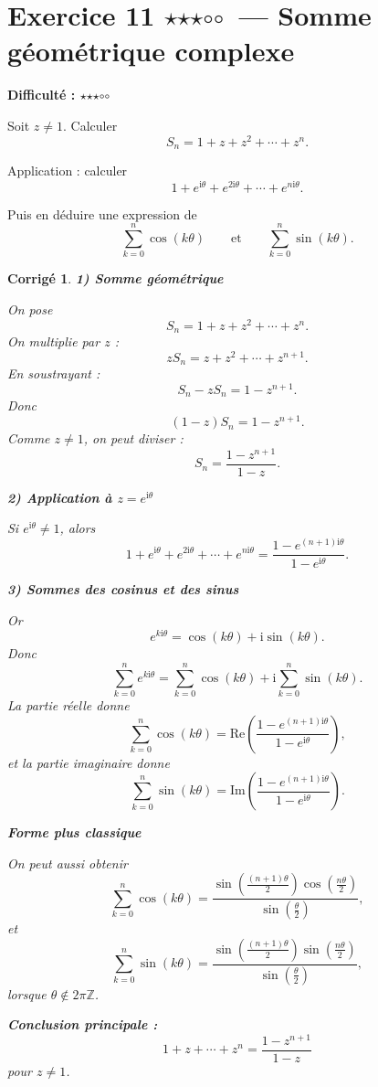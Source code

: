 \documentclass[11pt,a4paper]{article}
\newtheorem*{corrige}{Corrigé}
\newcommand{\ii}{\mathrm{i}}
\newcommand{\Ree}{\mathrm{Re}}
\newcommand{\Imm}{\mathrm{Im}}
\newcommand{\fullstar}{\(\star\)}
\newcommand{\emptystar}{\(\circ\)}
\newcommand{\threeStars}{\fullstar\fullstar\fullstar\emptystar\emptystar}
\newcommand{\difficulty}[1]{\textbf{Difficulté : #1}}
\begin{document}
\section{Exercice 11 \threeStars\ --- Somme géométrique complexe}
\difficulty{\threeStars}

Soit \(z\neq 1\). Calculer
\[
S_n=1+z+z^2+\cdots+z^n.
\]

Application : calculer
\[
1+e^{\ii\theta}+e^{2\ii\theta}+\cdots+e^{n\ii\theta}.
\]

Puis en déduire une expression de
\[
\sum_{k=0}^n \cos(k\theta)
\qquad \text{et} \qquad
\sum_{k=0}^n \sin(k\theta).
\]

\begin{corrige}
\textbf{1) Somme géométrique}

On pose
\[
S_n=1+z+z^2+\cdots+z^n.
\]
On multiplie par \(z\) :
\[
zS_n=z+z^2+\cdots+z^{n+1}.
\]
En soustrayant :
\[
S_n-zS_n=1-z^{n+1}.
\]
Donc
\[
(1-z)S_n=1-z^{n+1}.
\]
Comme \(z\neq 1\), on peut diviser :
\[
\boxed{S_n=\frac{1-z^{n+1}}{1-z}}.
\]

\textbf{2) Application à \(z=e^{\ii\theta}\)}

Si \(e^{\ii\theta}\neq 1\), alors
\[
1+e^{\ii\theta}+e^{2\ii\theta}+\cdots+e^{n\ii\theta}
=\frac{1-e^{(n+1)\ii\theta}}{1-e^{\ii\theta}}.
\]

\textbf{3) Sommes des cosinus et des sinus}

Or
\[
e^{k\ii\theta}=\cos(k\theta)+\ii\sin(k\theta).
\]
Donc
\[
\sum_{k=0}^n e^{k\ii\theta}
=
\sum_{k=0}^n \cos(k\theta)
+\ii \sum_{k=0}^n \sin(k\theta).
\]
La partie réelle donne
\[
\sum_{k=0}^n \cos(k\theta)=\Ree\left(\frac{1-e^{(n+1)\ii\theta}}{1-e^{\ii\theta}}\right),
\]
et la partie imaginaire donne
\[
\sum_{k=0}^n \sin(k\theta)=\Imm\left(\frac{1-e^{(n+1)\ii\theta}}{1-e^{\ii\theta}}\right).
\]

\textbf{Forme plus classique}

On peut aussi obtenir
\[
\sum_{k=0}^n \cos(k\theta)
=
\frac{\sin\left(\frac{(n+1)\theta}{2}\right)\cos\left(\frac{n\theta}{2}\right)}
{\sin\left(\frac{\theta}{2}\right)},
\]
et
\[
\sum_{k=0}^n \sin(k\theta)
=
\frac{\sin\left(\frac{(n+1)\theta}{2}\right)\sin\left(\frac{n\theta}{2}\right)}
{\sin\left(\frac{\theta}{2}\right)},
\]
lorsque \(\theta\notin 2\pi\mathbb{Z}\).

\textbf{Conclusion principale :}
\[
\boxed{1+z+\cdots+z^n=\frac{1-z^{n+1}}{1-z}}
\]
pour \(z\neq 1\).
\end{corrige}
\end{document}
